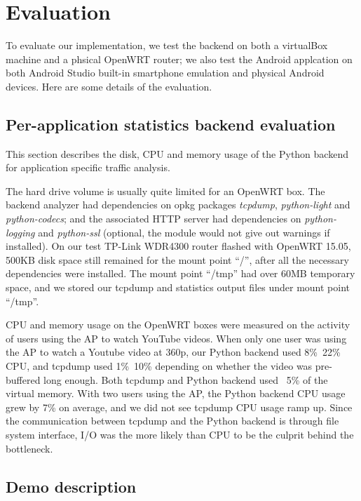 \section{Evaluation}
To evaluate our implementation, we test the backend on both a virtualBox machine and a phsical OpenWRT router; we also test the Android applcation on both Android Studio built-in smartphone emulation and physical Android devices. Here are some details of the evaluation.

\subsection{Per-application statistics backend evaluation}

This section describes the disk, CPU and memory usage of the Python backend for application specific traffic analysis. 

The hard drive volume is usually quite limited for an OpenWRT box. The backend analyzer had dependencies on opkg packages \textit{tcpdump}, \textit{python-light} and \textit{python-codecs}; and the associated HTTP server had dependencies on \textit{python-logging} and \textit{python-ssl} (optional, the module would not give out warnings if installed). On our test TP-Link WDR4300 router flashed with OpenWRT 15.05, 500KB disk space still remained for the mount point ``/'', after all the necessary dependencies were installed. The mount point ``/tmp'' had over 60MB temporary space, and we stored our tcpdump and statistics output files under mount point ``/tmp''.

CPU and memory usage on the OpenWRT boxes were measured on the activity of users using the AP to watch YouTube videos. When only one user was using the AP to watch a Youtube video at 360p, our Python backend used 8\%~22\% CPU, and tcpdump used 1\%~10\% depending on whether the video was pre-buffered long enough. Both tcpdump and Python backend used ~5\% of the virtual memory. With two users using the AP, the Python backend CPU usage grew by 7\% on average, and we did not see tcpdump CPU usage ramp up. Since the communication between tcpdump and the Python backend is through file system interface, I/O was the more likely than CPU to be the culprit behind the bottleneck.

\subsection{Demo description}

